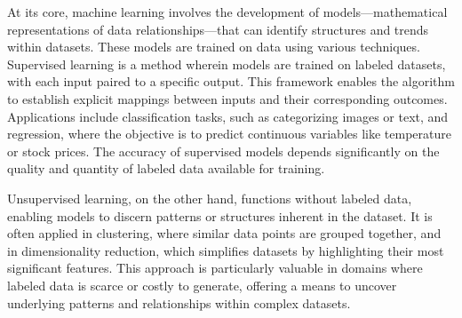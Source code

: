 \documentclass[
  letterpaper,
  11pt,
  english,
  singlespacing,
  headsepline]{MastersDoctoralThesis}
\begin{document}
\begin{spacing}{1.5}
At its core, machine learning involves the development of
models---mathematical representations of data relationships---that can
identify structures and trends within datasets. These models are trained
on data using various techniques. Supervised learning is a method
wherein models are trained on labeled datasets, with each input paired
to a specific output. This framework enables the algorithm to establish
explicit mappings between inputs and their corresponding outcomes.
Applications include classification tasks, such as categorizing images
or text, and regression, where the objective is to predict continuous
variables like temperature or stock prices. The accuracy of supervised
models depends significantly on the quality and quantity of labeled data
available for training.

Unsupervised learning, on the other hand, functions without labeled
data, enabling models to discern patterns or structures inherent in the
dataset. It is often applied in clustering, where similar data points
are grouped together, and in dimensionality reduction, which simplifies
datasets by highlighting their most significant features. This approach
is particularly valuable in domains where labeled data is scarce or
costly to generate, offering a means to uncover underlying patterns and
relationships within complex datasets.


\end{spacing}
\end{document}
